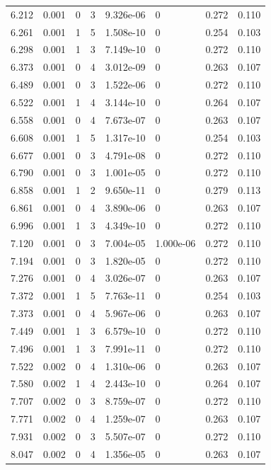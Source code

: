\documentclass[preview]{standalone}
\begin{document}
{{{\begin{tabular}{L{1.2cm}C{1.2cm} C{0.3cm}C{0.5cm} C{1.4cm}C{1.4cm} C{1.4cm}C{1.4cm}}
  6.212  &  0.001  & 0     &  3 &  9.326e-06  & 0  & 0.272 &  0.110   \\ 
  6.261  &  0.001  & 1     &  5 &  1.508e-10  & 0  & 0.254 &  0.103   \\ 
  6.298  &  0.001  & 1     &  3 &  7.149e-10  & 0  & 0.272 &  0.110   \\ 
  6.373  &  0.001  & 0     &  4 &  3.012e-09  & 0  & 0.263 &  0.107   \\ 
  6.489  &  0.001  & 0     &  3 &  1.522e-06  & 0  & 0.272 &  0.110   \\ 
  6.522  &  0.001  & 1     &  4 &  3.144e-10  & 0  & 0.264 &  0.107   \\ 
  6.558  &  0.001  & 0     &  4 &  7.673e-07  & 0  & 0.263 &  0.107   \\ 
  6.608  &  0.001  & 1     &  5 &  1.317e-10  & 0  & 0.254 &  0.103   \\ 
  6.677  &  0.001  & 0     &  3 &  4.791e-08  & 0  & 0.272 &  0.110   \\ 
  6.790  &  0.001  & 0     &  3 &  1.001e-05  & 0  & 0.272 &  0.110   \\ 
  6.858  &  0.001  & 1     &  2 &  9.650e-11  & 0  & 0.279 &  0.113   \\ 
  6.861  &  0.001  & 0     &  4 &  3.890e-06  & 0  & 0.263 &  0.107   \\ 
  6.996  &  0.001  & 1     &  3 &  4.349e-10  & 0  & 0.272 &  0.110   \\ 
  7.120  &  0.001  & 0     &  3 &  7.004e-05  & 1.000e-06  & 0.272 &  0.110   \\ 
  7.194  &  0.001  & 0     &  3 &  1.820e-05  & 0  & 0.272 &  0.110   \\ 
  7.276  &  0.001  & 0     &  4 &  3.026e-07  & 0  & 0.263 &  0.107   \\ 
  7.372  &  0.001  & 1     &  5 &  7.763e-11  & 0  & 0.254 &  0.103   \\ 
  7.373  &  0.001  & 0     &  4 &  5.967e-06  & 0  & 0.263 &  0.107   \\ 
  7.449  &  0.001  & 1     &  3 &  6.579e-10  & 0  & 0.272 &  0.110   \\ 
  7.496  &  0.001  & 1     &  3 &  7.991e-11  & 0  & 0.272 &  0.110   \\ 
  7.522  &  0.002  & 0     &  4 &  1.310e-06  & 0  & 0.263 &  0.107   \\ 
  7.580  &  0.002  & 1     &  4 &  2.443e-10  & 0  & 0.264 &  0.107   \\ 
  7.707  &  0.002  & 0     &  3 &  8.759e-07  & 0  & 0.272 &  0.110   \\ 
  7.771  &  0.002  & 0     &  4 &  1.259e-07  & 0  & 0.263 &  0.107   \\ 
  7.931  &  0.002  & 0     &  3 &  5.507e-07  & 0  & 0.272 &  0.110   \\ 
  8.047  &  0.002  & 0     &  4 &  1.356e-05  & 0  & 0.263 &  0.107   \\ 
\hline 
\end{tabular} 

}}}
\end{document}
